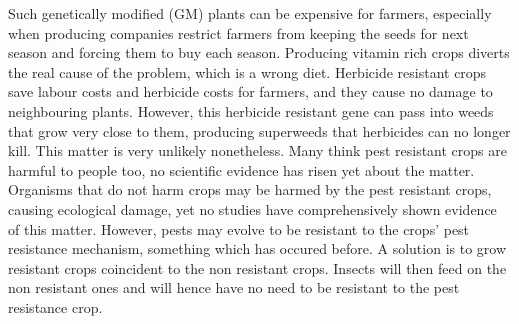 Such genetically modified (GM) plants can be expensive for farmers, especially when producing 
companies restrict farmers from keeping the seeds for next season and forcing them to buy each
season. Producing vitamin rich crops diverts the real cause of the problem, which is a wrong diet.
Herbicide resistant crops save labour costs and herbicide costs for farmers, and they cause no
damage to neighbouring plants. However, this herbicide resistant gene can pass into weeds that
grow very close to them, producing superweeds that herbicides can no longer kill. This matter is
very unlikely nonetheless. Many think pest resistant crops are harmful to people too, no scientific
evidence has risen yet about the matter. Organisms that do not harm crops may be harmed by the
pest resistant crops, causing ecological damage, yet no studies have comprehensively shown evidence
of this matter. However, pests may evolve to be resistant to the crops' pest resistance mechanism,
something which has occured before. A solution is to grow resistant crops coincident to the non
resistant crops. Insects will then feed on the non resistant ones and will hence have no need to
be resistant to the pest resistance crop. 
